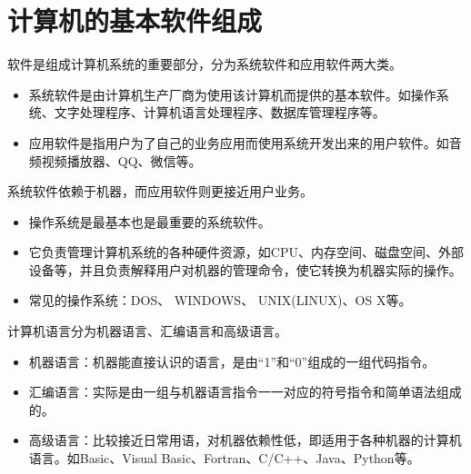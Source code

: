 \section{计算机的基本软件组成}

\begin{frame}\ft{\secname}
软件是组成计算机系统的重要部分，分为系统软件和应用软件两大类。 
\end{frame}

\begin{frame}\ft{\secname}
\begin{itemize}
\item 系统软件是由计算机生产厂商为使用该计算机而提供的基本软件。如操作系统、文字处理程序、计算机语言处理程序、数据库管理程序等。\\[0.1in]
\item 应用软件是指用户为了自己的业务应用而使用系统开发出来的用户软件。如音频视频播放器、QQ、微信等。
\end{itemize}
系统软件依赖于机器，而应用软件则更接近用户业务。
\end{frame}

\begin{frame}
\begin{itemize}
\item 操作系统是最基本也是最重要的系统软件。\\[0.1in]
\item 它负责管理计算机系统的各种硬件资源，如CPU、内存空间、磁盘空间、外部设备等，并且负责解释用户对机器的管理命令，使它转换为机器实际的操作。\\[0.1in]
\item 常见的操作系统：DOS、 WINDOWS、 UNIX(LINUX)、OS X等。
\end{itemize}
\end{frame}

\begin{frame}
计算机语言分为机器语言、汇编语言和高级语言。 

\begin{itemize}
\item 机器语言：机器能直接认识的语言，是由“1”和“0”组成的一组代码指令。\\[0.1in]
\item 汇编语言：实际是由一组与机器语言指令一一对应的符号指令和简单语法组成的。\\[0.1in]
\item 高级语言：比较接近日常用语，对机器依赖性低，即适用于各种机器的计算机语言。如Basic、Visual Basic、Fortran、C/C++、Java、Python等。
\end{itemize}
\end{frame}

